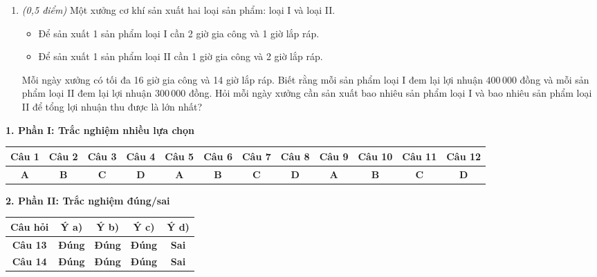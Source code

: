 \documentclass[12pt,a4paper]{article}
\newcommand{\parttitle}[1]{\par\vspace{2pt}{\large\bfseries\color{ink}#1}\par\vspace{1pt}}
\begin{document}
\begin{enumerate}[resume]
\item \textit{(0,5 điểm)} Một xưởng cơ khí sản xuất hai loại sản phẩm: loại I và loại II.
\begin{itemize}[leftmargin=0.5cm]
    \item Để sản xuất 1 sản phẩm loại I cần 2 giờ gia công và 1 giờ lắp ráp.
    \item Để sản xuất 1 sản phẩm loại II cần 1 giờ gia công và 2 giờ lắp ráp.
\end{itemize}
Mỗi ngày xưởng có tối đa 16 giờ gia công và 14 giờ lắp ráp. Biết rằng mỗi sản phẩm loại I đem lại lợi nhuận $400\,000$ đồng và mỗi sản phẩm loại II đem lại lợi nhuận $300\,000$ đồng. Hỏi mỗi ngày xưởng cần sản xuất bao nhiêu sản phẩm loại I và bao nhiêu sản phẩm loại II để tổng lợi nhuận thu được là lớn nhất?
\end{enumerate}

\newpage
\parttitle{BẢNG ĐÁP ÁN TỔNG HỢP}

\vspace{0.2cm}
\textbf{1. Phần I: Trắc nghiệm nhiều lựa chọn}
\begin{center}
{\setlength{\tabcolsep}{2.5pt}\small
\begin{tabular}{|c|c|c|c|c|c|c|c|c|c|c|c|}
\hline
\textbf{Câu 1} & \textbf{Câu 2} & \textbf{Câu 3} & \textbf{Câu 4} & \textbf{Câu 5} & \textbf{Câu 6} & \textbf{Câu 7} & \textbf{Câu 8} & \textbf{Câu 9} & \textbf{Câu 10} & \textbf{Câu 11} & \textbf{Câu 12} \\
\hline
\textbf{A} & \textbf{B} & \textbf{C} & \textbf{D} & \textbf{A} & \textbf{B} & \textbf{C} & \textbf{D} & \textbf{A} & \textbf{B} & \textbf{C} & \textbf{D} \\
\hline
\end{tabular}}
\end{center}

\vspace{0.2cm}
\textbf{2. Phần II: Trắc nghiệm đúng/sai}
\begin{center}
\begin{tabular}{|c|c|c|c|c|}
\hline
\textbf{Câu hỏi} & \textbf{Ý a)} & \textbf{Ý b)} & \textbf{Ý c)} & \textbf{Ý d)} \\
\hline
\textbf{Câu 13} & \textbf{Đúng} & \textbf{Đúng} & \textbf{Đúng} & \textbf{Sai} \\
\hline
\textbf{Câu 14} & \textbf{Đúng} & \textbf{Đúng} & \textbf{Đúng} & \textbf{Sai} \\
\hline
\end{tabular}
\end{center}
\end{document}
